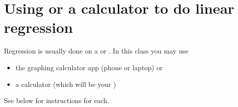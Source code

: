 \newpage 
\section{Using \myDesmos or a \myTi calculator to do linear regression}

\begin{tcolorbox}[center,width=5.5in]
    \small
    Regression is usually 
    done on a  or . 
    In this class you may use 
    \begin{itemize}[nosep]
        \item the \myDesmos graphing calculator app (phone or laptop) or
        \item a \myTi calculator (which will be your )
    \end{itemize}
    See below for instructions for each.
\end{tcolorbox}
